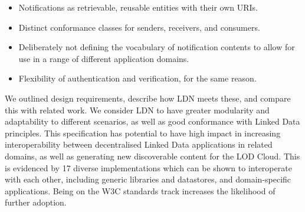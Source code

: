                             \begin{itemize}
  \item Notifications as retrievable, reusable entities with their own URIs.\item Distinct conformance classes for senders, receivers, and consumers.\item Deliberately not defining the vocabulary of notification contents to allow for use in a range of different application domains.\item Flexibility of authentication and verification, for the same reason.
    \end{itemize}
  

                            
\par We outlined design requirements, describe how LDN meets these, and compare this with related work. We consider LDN to have greater modularity and adaptability to different scenarios, as well as good conformance with Linked Data principles. This specification has potential to have high impact in increasing interoperability between decentralised Linked Data applications in related domains, as well as generating new discoverable content for the LOD Cloud. This is evidenced by 17 diverse implementations which can be shown to interoperate with each other, including generic libraries and datastores, and domain-specific applications. Being on the W3C standards track increases the likelihood of further adoption.

                            
                            
                        
                    

                    
                        
